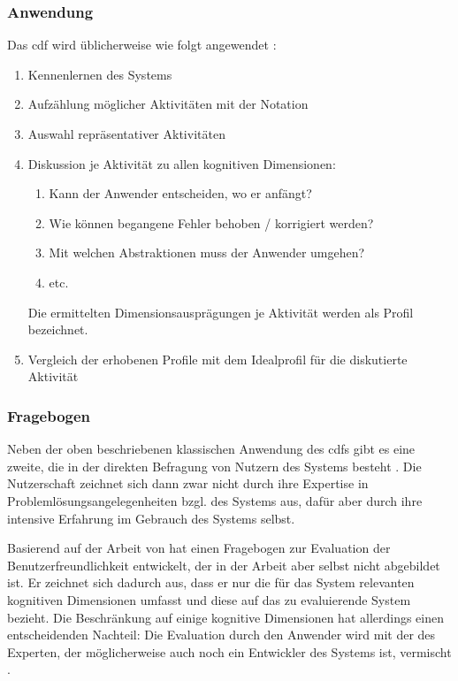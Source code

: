 \begin{important}
\subsubsection{Anwendung}
\label{sec:cdf-application}

Das \gls{cdf} wird üblicherweise wie folgt angewendet \citep{AnIntroductiontot:1996ux,carroll2003hci}:
\begin{enumerate}
\itemsep1pt\parskip0pt
\item Kennenlernen des Systems
\item Aufzählung möglicher Aktivitäten mit der Notation
\item Auswahl repräsentativer Aktivitäten
\item Diskussion je Aktivität zu allen kognitiven Dimensionen:
    \begin{enumerate}
    \item Kann der Anwender entscheiden, wo er anfängt?
    \item Wie können begangene Fehler behoben / korrigiert werden?
    \item Mit welchen Abstraktionen muss der Anwender umgehen?
    \item etc.
    \end{enumerate}
    Die ermittelten Dimensionsausprägungen je Aktivität werden als Profil bezeichnet.
\item Vergleich der erhobenen Profile mit dem Idealprofil für die diskutierte Aktivität
\end{enumerate}


\subsubsection{Fragebogen}
\label{sec:cdf-questionnaire}

Neben der oben beschriebenen klassischen Anwendung des \gls{cdf}s gibt es eine zweite, die in der direkten Befragung von Nutzern des Systems besteht \citep{161956,carroll2003hci}. Die Nutzerschaft zeichnet sich dann zwar nicht durch ihre Expertise in Problemlösungsangelegenheiten bzgl. des Systems aus, dafür aber durch ihre intensive Erfahrung im Gebrauch des Systems selbst. 

Basierend auf der Arbeit von \cite{Green:1996gm} hat \cite{Kadoda:2000vj} einen Fragebogen zur Evaluation der Benutzerfreundlichkeit entwickelt, der in der Arbeit aber selbst nicht abgebildet ist. Er zeichnet sich dadurch aus, dass er nur die für das System relevanten kognitiven Dimensionen umfasst und diese auf das zu evaluierende System bezieht. Die Beschränkung auf einige kognitive Dimensionen hat allerdings einen entscheidenden Nachteil: Die Evaluation durch den Anwender wird mit der des Experten, der möglicherweise auch noch ein Entwickler des Systems ist, vermischt \citep{carroll2003hci}.


\end{important}
